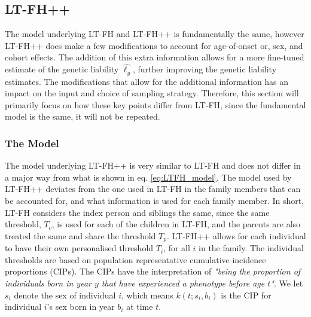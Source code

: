 \subsection{LT-FH++}

The model underlying LT-FH and LT-FH++ is fundamentally the same, however LT-FH++ does make a few modifications to account for age-of-onset or, sex, and cohort effects. The addition of this extra information allows for a more fine-tuned estimate of the genetic liability $ \hat{\ell_g} $, further improving the genetic liability estimates. The modifications that allow for the additional information has an impact on the input and choice of sampling strategy. Therefore, this section will primarily focus on how these key points differ from LT-FH, since the fundamental model is the same, it will not be repeated. 

\subsubsection{The Model}

The model underlying LT-FH++ is very similar to LT-FH and does not differ in a major way from what is shown in eq. \ref{eq:LTFH_model}. The model used by LT-FH++ deviates from the one used in LT-FH in the family members that can be accounted for, and what information is used for each family member. In short, LT-FH considers the index person and siblings the same, since the same threshold, $ T_c $, is used for each of the children in LT-FH, and the parents are also treated the same and share the threshold $ T_p $. LT-FH++ allows for each individual to have their own personalised threshold $ T_i $, for all $ i $ in the family. The individual thresholds are based on population representative cumulative incidence proportions (CIPs). The CIPs have the interpretation of \textit{"being the proportion of individuals born in year $ y $ that have experienced a phenotype before age $ t $"}. We let $ s_i $ denote the sex of individual $ i $, which means $ k(t; s_i, b_i) $ is the CIP for individual $ i $'s sex born in year $ b_i $ at time $ t $.


